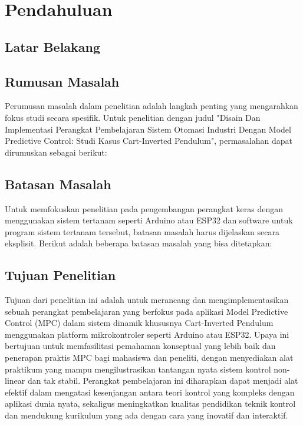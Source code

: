 \chapter{Pendahuluan}
\section{Latar Belakang}

\section{Rumusan Masalah}
Perumusan masalah dalam penelitian adalah langkah penting yang mengarahkan fokus studi secara spesifik. Untuk penelitian dengan judul "Disain Dan Implementasi Perangkat Pembelajaran Sistem Otomasi Industri Dengan Model Predictive Control: Studi Kasus Cart-Inverted Pendulum", permasalahan dapat dirumuskan sebagai berikut:


\section{Batasan Masalah}
Untuk memfokuskan penelitian pada pengembangan perangkat keras dengan menggunakan sistem tertanam seperti Arduino atau ESP32 dan software untuk program sistem tertanam tersebut, batasan masalah harus dijelaskan secara eksplisit. Berikut adalah beberapa batasan masalah yang bisa ditetapkan:



\section{Tujuan Penelitian}
Tujuan dari penelitian ini adalah untuk merancang dan mengimplementasikan sebuah perangkat pembelajaran yang berfokus pada aplikasi Model Predictive Control (MPC) dalam sistem dinamik khususnya Cart-Inverted Pendulum menggunakan platform mikrokontroler seperti Arduino atau ESP32. Upaya ini bertujuan untuk memfasilitasi pemahaman konseptual yang lebih baik dan penerapan praktis MPC bagi mahasiswa dan peneliti, dengan menyediakan alat praktikum yang mampu mengilustrasikan tantangan nyata sistem kontrol non-linear dan tak stabil. Perangkat pembelajaran ini diharapkan dapat menjadi alat efektif dalam mengatasi kesenjangan antara teori kontrol yang kompleks dengan aplikasi dunia nyata, sekaligus meningkatkan kualitas pendidikan teknik kontrol dan mendukung kurikulum yang ada dengan cara yang inovatif dan interaktif.

